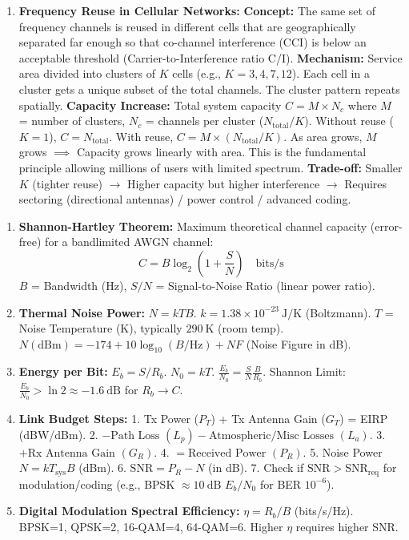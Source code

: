 \documentclass[11pt]{article}
\begin{document}
\begin{exoresolu}
\begin{enumerate}
\item \textbf{Frequency Reuse in Cellular Networks:}
\textbf{Concept:} The same set of frequency channels is reused in different cells that are geographically separated far enough so that co-channel interference (CCI) is below an acceptable threshold (Carrier-to-Interference ratio C/I).
\textbf{Mechanism:} Service area divided into clusters of $K$ cells (e.g., $K=3, 4, 7, 12$). Each cell in a cluster gets a unique subset of the total channels. The cluster pattern repeats spatially.
\textbf{Capacity Increase:} Total system capacity $C = M \times N_c$ where $M$ = number of clusters, $N_c$ = channels per cluster ($N_{\mathrm{total}}/K$). Without reuse ($K=1$), $C = N_{\mathrm{total}}$. With reuse, $C = M \times (N_{\mathrm{total}}/K)$. As area grows, $M$ grows $\implies$ Capacity grows linearly with area. This is the fundamental principle allowing millions of users with limited spectrum.
\textbf{Trade-off:} Smaller $K$ (tighter reuse) $\to$ Higher capacity but higher interference $\to$ Requires sectoring (directional antennas) / power control / advanced coding.
\end{enumerate}
\end{exoresolu}

\begin{methode}
\begin{enumerate}
\item \textbf{Shannon-Hartley Theorem:} Maximum theoretical channel capacity (error-free) for a bandlimited AWGN channel:
\[
C = B \log_2 \left(1 + \frac{S}{N}\right) \quad \text{bits/s}
\]
$B$ = Bandwidth (Hz), $S/N$ = Signal-to-Noise Ratio (linear power ratio).
\item \textbf{Thermal Noise Power:} $N = k T B$. $k = 1.38 \times 10^{-23}\ \mathrm{J/K}$ (Boltzmann). $T$ = Noise Temperature (K), typically $290\ \mathrm{K}$ (room temp).
$N(\mathrm{dBm}) = -174 + 10\log_{10}(B/\mathrm{Hz}) + NF$ (Noise Figure in dB).
\item \textbf{Energy per Bit:} $E_b = S / R_b$. $N_0 = kT$. $\frac{E_b}{N_0} = \frac{S}{N} \frac{B}{R_b}$.
Shannon Limit: $\frac{E_b}{N_0} > \ln 2 \approx -1.6\ \mathrm{dB}$ for $R_b \to C$.
\item \textbf{Link Budget Steps:}
1. Tx Power ($P_T$) + Tx Antenna Gain ($G_T$) = EIRP (dBW/dBm).
2. $- \text{Path Loss } (L_p) - \text{Atmospheric/Misc Losses } (L_a)$.
3. $+ \text{Rx Antenna Gain } (G_R)$.
4. $= \text{Received Power } (P_R)$.
5. Noise Power $N = k T_{\mathrm{sys}} B$ (dBm).
6. $\mathrm{SNR} = P_R - N$ (in dB).
7. Check if $\mathrm{SNR} > \mathrm{SNR}_{\mathrm{req}}$ for modulation/coding (e.g., BPSK $\approx 10\ \mathrm{dB}$ $E_b/N_0$ for BER $10^{-6}$).
\item \textbf{Digital Modulation Spectral Efficiency:} $\eta = R_b / B$ (bits/s/Hz). BPSK=1, QPSK=2, 16-QAM=4, 64-QAM=6. Higher $\eta$ requires higher SNR.
\end{enumerate}
\end{methode}
\end{document}
